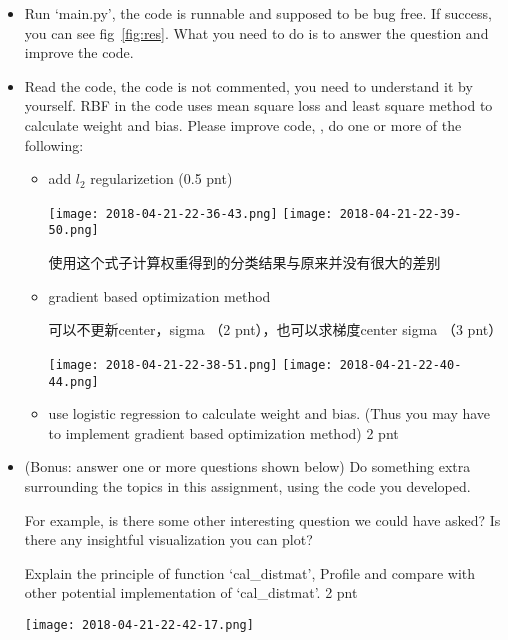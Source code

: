 \documentclass[12pt]{article}
\begin{document}
\begin{itemize}
	\item Run `main.py', the code is runnable and supposed to be bug free. If success, you can see fig~\ref{fig:res}. What you need to do is to answer the question and improve the code.
	\item Read the code, the code is not commented, you need to understand it by yourself. RBF in the code uses mean square loss and least square method to calculate weight and bias. Please improve code, \ie, do one or more of the following:
	\begin{itemize}
		\item add $l_2$ regularizetion (0.5 pnt)

		\begin{center}
			\texttt{[image: 2018-04-21-22-36-43.png]}
			\texttt{[image: 2018-04-21-22-39-50.png]}
		\end{center}
		使用这个式子计算权重得到的分类结果与原来并没有很大的差别 

		\item  gradient based optimization method

		可以不更新center，sigma （2 pnt），也可以求梯度center sigma （3 pnt）
		\begin{center}
			\texttt{[image: 2018-04-21-22-38-51.png]}
			\texttt{[image: 2018-04-21-22-40-44.png]}
		\end{center}

		\item use logistic regression  to calculate weight and bias. (Thus you may have to implement  gradient based optimization method) 2 pnt 
 

	\end{itemize}
	
	\item (Bonus: answer one or more questions shown below) Do something extra surrounding the topics in this assignment, using the code you developed.
		
		For example, is there some other interesting question we could have asked? Is there any
		insightful visualization you can plot? 

		Explain the principle  of function `cal\_distmat', Profile and compare with other potential implementation of `cal\_distmat'. 2 pnt 
		
		\begin{center}
			\texttt{[image: 2018-04-21-22-42-17.png]}
		\end{center}


\end{itemize}
\end{document}
